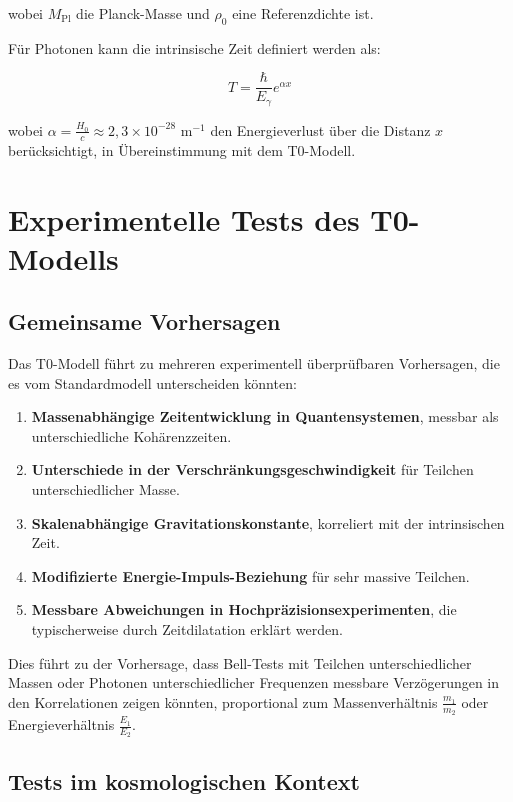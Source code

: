 \documentclass[a4paper,12pt]{article}
\theoremstyle{definition}
\theoremstyle{remark}
\begin{document}
	wobei $M_{\text{Pl}}$ die Planck-Masse und $\rho_0$ eine Referenzdichte ist.
	
	Für Photonen kann die intrinsische Zeit definiert werden als:
	
	\begin{equation}
		T = \frac{\hbar}{E_{\gamma}} e^{\alpha x}
	\end{equation}
	
	wobei $\alpha = \frac{H_0}{c} \approx 2{,}3 \times 10^{-28}$ m$^{-1}$ den Energieverlust über die Distanz $x$ berücksichtigt, in Übereinstimmung mit dem T0-Modell.
	
	\section{Experimentelle Tests des T0-Modells}
	
	\subsection{Gemeinsame Vorhersagen}
	
	Das T0-Modell führt zu mehreren experimentell überprüfbaren Vorhersagen, die es vom Standardmodell unterscheiden könnten:
	
	\begin{enumerate}
		\item \textbf{Massenabhängige Zeitentwicklung in Quantensystemen}, messbar als unterschiedliche Kohärenzzeiten.
		\item \textbf{Unterschiede in der Verschränkungsgeschwindigkeit} für Teilchen unterschiedlicher Masse.
		\item \textbf{Skalenabhängige Gravitationskonstante}, korreliert mit der intrinsischen Zeit.
		\item \textbf{Modifizierte Energie-Impuls-Beziehung} für sehr massive Teilchen.
		\item \textbf{Messbare Abweichungen in Hochpräzisionsexperimenten}, die typischerweise durch Zeitdilatation erklärt werden.
	\end{enumerate}
	
	Dies führt zu der Vorhersage, dass Bell-Tests mit Teilchen unterschiedlicher Massen oder Photonen unterschiedlicher Frequenzen messbare Verzögerungen in den Korrelationen zeigen könnten, proportional zum Massenverhältnis $\frac{m_1}{m_2}$ oder Energieverhältnis $\frac{E_1}{E_2}$.
	
	\subsection{Tests im kosmologischen Kontext}
	
\end{document}

